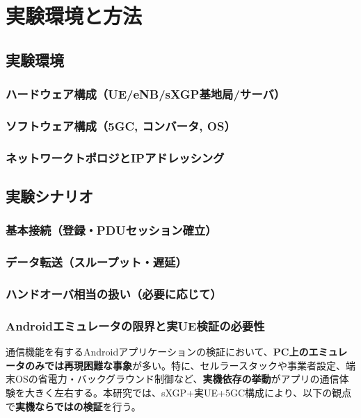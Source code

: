 \chapter{実験環境と方法}
\label{chap:experiment}

\section{実験環境}
\subsection{ハードウェア構成（UE/eNB/sXGP基地局/サーバ）}
\subsection{ソフトウェア構成（5GC, コンバータ, OS）}
\subsection{ネットワークトポロジとIPアドレッシング}

\section{実験シナリオ}
\subsection{基本接続（登録・PDUセッション確立）}
\subsection{データ転送（スループット・遅延）}
\subsection{ハンドオーバ相当の扱い（必要に応じて）}

\subsection{Androidエミュレータの限界と実UE検証の必要性}
通信機能を有するAndroidアプリケーションの検証において、\textbf{PC上のエミュレータのみでは再現困難な事象}が多い。特に、セルラースタックや事業者設定、端末OSの省電力・バックグラウンド制御など、\textbf{実機依存の挙動}がアプリの通信体験を大きく左右する。本研究では、sXGP+実UE+5GC構成により、以下の観点で\textbf{実機ならではの検証}を行う。

